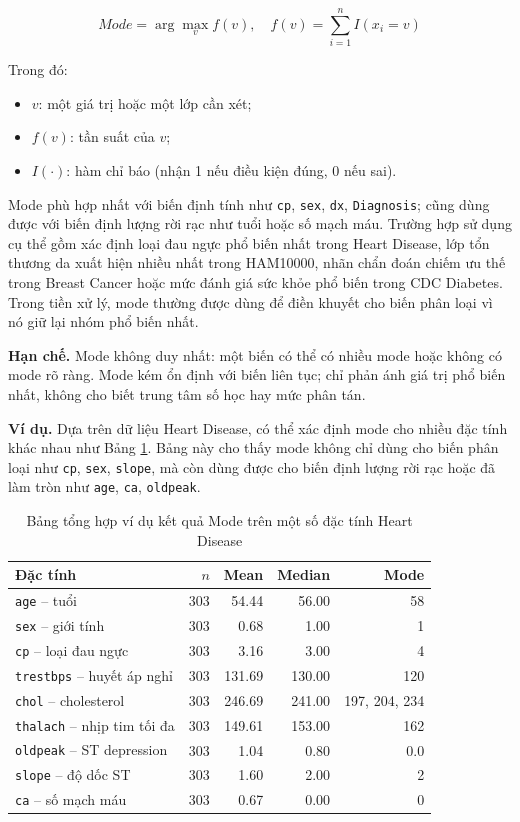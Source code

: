 \begin{equation}
Mode = \arg\max_v f(v), \quad f(v)=\sum_{i=1}^{n} I(x_i=v)
\end{equation}

Trong đó:
\begin{itemize}[leftmargin=1.6em,label=\textbullet]
 \item $v$: một giá trị hoặc một lớp cần xét;
 \item $f(v)$: tần suất của $v$;
 \item $I(\cdot)$: hàm chỉ báo (nhận 1 nếu điều kiện đúng, 0 nếu sai).
\end{itemize}

Mode phù hợp nhất với biến định tính như \texttt{cp}, \texttt{sex}, \texttt{dx}, \texttt{Diagnosis}; cũng dùng được với biến định lượng rời rạc như tuổi hoặc số mạch máu. Trường hợp sử dụng cụ thể gồm xác định loại đau ngực phổ biến nhất trong Heart Disease, lớp tổn thương da xuất hiện nhiều nhất trong HAM10000, nhãn chẩn đoán chiếm ưu thế trong Breast Cancer hoặc mức đánh giá sức khỏe phổ biến trong CDC Diabetes. Trong tiền xử lý, mode thường được dùng để điền khuyết cho biến phân loại vì nó giữ lại nhóm phổ biến nhất.

\textbf{Hạn chế.} Mode không duy nhất: một biến có thể có nhiều mode hoặc không có mode rõ ràng. Mode kém ổn định với biến liên tục; chỉ phản ánh giá trị phổ biến nhất, không cho biết trung tâm số học hay mức phân tán.

\textbf{Ví dụ.} Dựa trên dữ liệu Heart Disease, có thể xác định mode cho nhiều đặc tính khác nhau như Bảng \ref{tab:chapter1_mode_example}. Bảng này cho thấy mode không chỉ dùng cho biến phân loại như \texttt{cp}, \texttt{sex}, \texttt{slope}, mà còn dùng được cho biến định lượng rời rạc hoặc đã làm tròn như \texttt{age}, \texttt{ca}, \texttt{oldpeak}.

\begin{table}[H]
\centering
\caption{Bảng tổng hợp ví dụ kết quả Mode trên một số đặc tính Heart Disease}
\label{tab:chapter1_mode_example}
\small
\begin{tabular}{lrrrr}
\toprule
Đặc tính & $n$ & Mean & Median & Mode \\
\midrule
\texttt{age} -- tuổi & 303 & 54.44 & 56.00 & 58 \\
\texttt{sex} -- giới tính & 303 & 0.68 & 1.00 & 1 \\
\texttt{cp} -- loại đau ngực & 303 & 3.16 & 3.00 & 4 \\
\texttt{trestbps} -- huyết áp nghỉ & 303 & 131.69 & 130.00 & 120 \\
\texttt{chol} -- cholesterol & 303 & 246.69 & 241.00 & 197, 204, 234 \\
\texttt{thalach} -- nhịp tim tối đa & 303 & 149.61 & 153.00 & 162 \\
\texttt{oldpeak} -- ST depression & 303 & 1.04 & 0.80 & 0.0 \\
\texttt{slope} -- độ dốc ST & 303 & 1.60 & 2.00 & 2 \\
\texttt{ca} -- số mạch máu & 303 & 0.67 & 0.00 & 0 \\
\bottomrule
\end{tabular}
\end{table}

